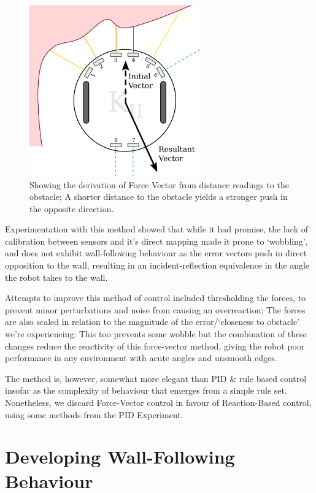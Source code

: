 \documentclass[11pt, a4paper]{article}
\begin{document}
\begin{figure}[h]
  \begin{center}
    \includegraphics[width=20em]{../assets/force-vector.png}
    \caption{Showing the derivation of Force Vector from distance readings to the
      obstacle; A shorter distance to the obstacle yields a stronger push in the 
      opposite direction.}
  \end{center}
\end{figure}

Experimentation with this method showed that while it had promise, the lack of 
calibration between sensors and it's direct mapping made it prone to `wobbling', and does not
exhibit wall-following behaviour as the error vectors push in direct opposition to 
the wall, resulting in an incident-reflection equivalence in the angle the robot
takes to the wall.

Attempts to improve this method of control included thresholding the forces, to 
prevent minor perturbations and noise from causing an overreaction; The forces are 
also scaled in relation to the magnitude of the error/`closeness to obstacle' we're 
experiencing: This too prevents some wobble but the combination of these changes 
reduce the reactivity of this force-vector method, giving the robot poor performance 
in any environment with acute angles and unsmooth edges.

The method is, however, somewhat more elegant than PID \& rule based control insofar 
as the complexity of behaviour that emerges from a simple rule set. Nonetheless, we 
discard Force-Vector control in favour of Reaction-Based control, using some methods 
from the PID Experiment.


\section{Developing Wall-Following Behaviour}
\end{document}
